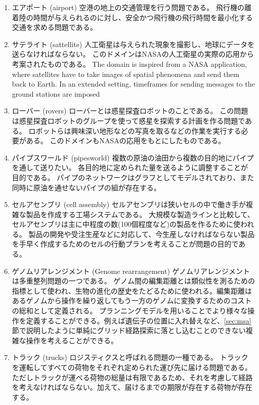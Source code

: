 \documentclass[10pt]{book}
\begin{document}
\begin{enumerate}
\item エアポート (airport)
空港の地上の交通管理を行う問題である。
飛行機の離着陸の時間が与えられるのに対し、安全かつ飛行機の飛行時間を最小化する交通を求める問題である。

\item サテライト (sattellite)
人工衛星は与えられた現象を撮影し、地球にデータを送らなければならない。
このドメインはNASAの人工衛星の実際の応用から考案されたものである。
The domain is inspired from a NASA application, where satellites have to take images
of spatial phenomena and send them back to Earth. In an extended setting, timeframes for sending
messages to the ground stations are imposed

\item ローバー (rovers)
ローバーとは惑星探査ロボットのことである。
この問題は惑星探査ロボットのグループを使って惑星を探索する計画を作る問題である。
ロボットらは興味深い地形などの写真を取るなどの作業を実行する必要がある。
このドメインもNASAの応用をもとにしたものである。

\item パイプスワールド (pipesworld)
複数の原油の油田から複数の目的地にパイプを通して送りたい。
各目的地に定められた量を送るように調整することが目的である。
パイプのネットワークはグラフとしてモデルされており、また同時に原油を通せないパイプの組が存在する。

\item セルアセンブリ (cell assembly)
セルアセンブリは狭いセルの中で働き手が複雑な製品を作成する工場システムである。
大規模な製造ラインと比較して、
セルアセンブリは主に中程度の数(100個程度など)の製品を作るために使われる。
製品の開発や受注生産などに対応して、今生産しなければならない製品を手早く作成するためのセルの行動プランを考えることが問題の目的である。
\cite{asai2014}

\item ゲノムリアレンジメント (Genome rearrangement)
ゲノムリアレンジメントは多重整列問題の一つである。
ゲノム間の編集距離とは類似性を測るための指標として使われ、生物の進化の歴史をたどるために使われる。編集距離はあるゲノムから操作を繰り返してもう一方のゲノムに変換するためのコストの総和として定義される。
プランニングモデルを用いることでより様々な操作を定義することができる。例えば遺伝子の位置に入れ替えなど、\ref{sec:msa}節で説明したように単純にグリッド経路探索に落とし込むことのできない複雑な操作を考えることができる。
\cite{erdem2005}

\item トラック (trucks)
ロジスティクスと呼ばれる問題の一種である。
トラックを運転してすべての荷物をそれぞれ定められた運び先に届ける問題である。
ただしトラックが運べる荷物の総量は有限であるため、それを考慮して経路を考えなければならない。加えて、届けるまでの期限が存在する荷物が存在する。

\end{enumerate}
\end{document}
